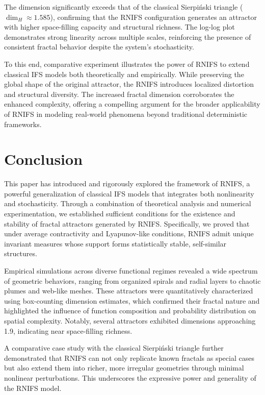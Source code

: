 \documentclass[twocolumn,10pt]{article}
\begin{document}
The dimension significantly exceeds that of the classical Sierpiński triangle ($\dim_H \approx 1.585$), confirming that the RNIFS configuration generates an attractor with higher space-filling capacity and structural richness. The log-log plot demonstrates strong linearity across multiple scales, reinforcing the presence of consistent fractal behavior despite the system’s stochasticity.


To this end, comparative experiment illustrates the power of RNIFS to extend classical IFS models both theoretically and empirically. While preserving the global shape of the original attractor, the RNIFS introduces localized distortion and structural diversity. The increased fractal dimension corroborates the enhanced complexity, offering a compelling argument for the broader applicability of RNIFS in modeling real-world phenomena beyond traditional deterministic frameworks.

\section{Conclusion}
\label{sec:conclusion}
\vspace{0.8em}

This paper has introduced and rigorously explored the framework of RNIFS, a powerful generalization of classical IFS models that integrates both nonlinearity and stochasticity. Through a combination of theoretical analysis and numerical experimentation, we established sufficient conditions for the existence and stability of fractal attractors generated by RNIFS. Specifically, we proved that under average contractivity and Lyapunov-like conditions, RNIFS admit unique invariant measures whose support forms statistically stable, self-similar structures.

Empirical simulations across diverse functional regimes revealed a wide spectrum of geometric behaviors, ranging from organized spirals and radial layers to chaotic plumes and web-like meshes. These attractors were quantitatively characterized using box-counting dimension estimates, which confirmed their fractal nature and highlighted the influence of function composition and probability distribution on spatial complexity. Notably, several attractors exhibited dimensions approaching 1.9, indicating near space-filling richness.

A comparative case study with the classical Sierpiński triangle further demonstrated that RNIFS can not only replicate known fractals as special cases but also extend them into richer, more irregular geometries through minimal nonlinear perturbations. This underscores the expressive power and generality of the RNIFS model.
\end{document}
